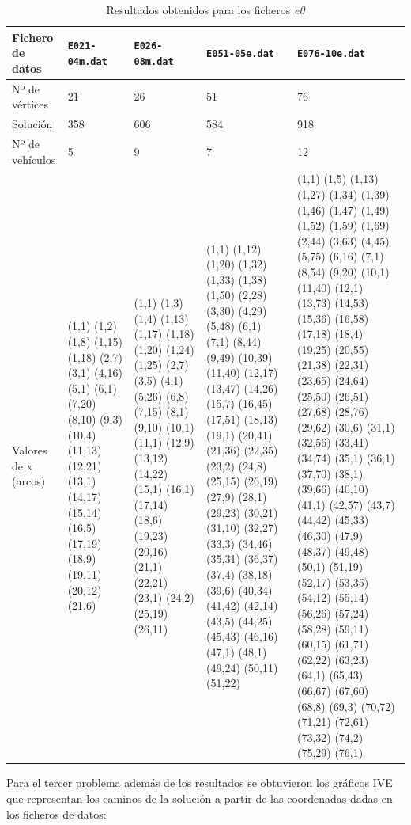 \documentclass[a4paper,11pt]{article}
\begin{document}
\begin{table}[!htbp]
\label{results_e0}
\centering
\begin{tabularx}{\textwidth}{|X|X|X|X|X|}
\hline
Fichero de datos	& \texttt{E021-04m.dat}	& \texttt{E026-08m.dat}	& \texttt{E051-05e.dat}	& \texttt{E076-10e.dat}	\\ \hline
Nº de vértices	& 21	& 26	& 51	& 76	\\ \hline
Solución	& 358	& 606	& 584	& 918	\\ \hline
Nº de vehículos	& 5	& 9	& 7	& 12	\\ \hline
Valores de x (arcos)	& (1,1) (1,2) (1,8) (1,15) (1,18) (2,7) (3,1) (4,16) (5,1) (6,1) (7,20) (8,10) (9,3) (10,4) (11,13) (12,21) (13,1) (14,17) (15,14) (16,5) (17,19) (18,9) (19,11) (20,12) (21,6)	& (1,1) (1,3) (1,4) (1,13) (1,17) (1,18) (1,20) (1,24) (1,25) (2,7) (3,5) (4,1) (5,26) (6,8) (7,15) (8,1) (9,10) (10,1) (11,1) (12,9) (13,12) (14,22) (15,1) (16,1) (17,14) (18,6) (19,23) (20,16) (21,1) (22,21) (23,1) (24,2) (25,19) (26,11)	& (1,1) (1,12) (1,20) (1,32) (1,33) (1,38) (1,50) (2,28) (3,30) (4,29) (5,48) (6,1) (7,1) (8,44) (9,49) (10,39) (11,40) (12,17) (13,47) (14,26) (15,7) (16,45) (17,51) (18,13) (19,1) (20,41) (21,36) (22,35) (23,2) (24,8) (25,15) (26,19) (27,9) (28,1) (29,23) (30,21) (31,10) (32,27) (33,3) (34,46) (35,31) (36,37) (37,4) (38,18) (39,6) (40,34) (41,42) (42,14) (43,5) (44,25) (45,43) (46,16) (47,1) (48,1) (49,24) (50,11) (51,22)	& (1,1) (1,5) (1,13) (1,27) (1,34) (1,39) (1,46) (1,47) (1,49) (1,52) (1,59) (1,69) (2,44) (3,63) (4,45) (5,75) (6,16) (7,1) (8,54) (9,20) (10,1) (11,40) (12,1) (13,73) (14,53) (15,36) (16,58) (17,18) (18,4) (19,25) (20,55) (21,38) (22,31) (23,65) (24,64) (25,50) (26,51) (27,68) (28,76) (29,62) (30,6) (31,1) (32,56) (33,41) (34,74) (35,1) (36,1) (37,70) (38,1) (39,66) (40,10) (41,1) (42,57) (43,7) (44,42) (45,33) (46,30) (47,9) (48,37) (49,48) (50,1) (51,19) (52,17) (53,35) (54,12) (55,14) (56,26) (57,24) (58,28) (59,11) (60,15) (61,71) (62,22) (63,23) (64,1) (65,43) (66,67) (67,60) (68,8) (69,3) (70,72) (71,21) (72,61) (73,32) (74,2) (75,29) (76,1)	\\ \hline
\end{tabularx}
\caption{Resultados obtenidos para los ficheros \textit{e0}}
\end{table}

\newpage
Para el tercer problema además de los resultados se obtuvieron los gráficos IVE que representan los caminos de la solución a partir de las coordenadas dadas en los ficheros de datos:
\end{document}

